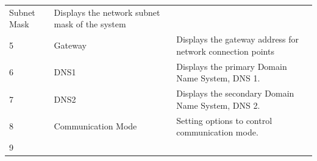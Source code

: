 \begin{longtable}[]{@{}|l|l|l|@{}}
\begin{minipage}[t]{0.23\columnwidth}
Subnet Mask\strut
\end{minipage} & \begin{minipage}[t]{0.65\columnwidth}\raggedright
Displays the network subnet mask of the system\strut
\end{minipage}\tabularnewline
\begin{minipage}[t]{0.04\columnwidth}\raggedright
5\strut
\end{minipage} & \begin{minipage}[t]{0.23\columnwidth}\raggedright
Gateway\strut
\end{minipage} & \begin{minipage}[t]{0.65\columnwidth}\raggedright
Displays the gateway address for network connection points\strut
\end{minipage}\tabularnewline
\begin{minipage}[t]{0.04\columnwidth}\raggedright
6\strut
\end{minipage} & \begin{minipage}[t]{0.23\columnwidth}\raggedright
DNS1\strut
\end{minipage} & \begin{minipage}[t]{0.65\columnwidth}\raggedright
Displays the primary Domain Name System, DNS 1.\strut
\end{minipage}\tabularnewline
\begin{minipage}[t]{0.04\columnwidth}\raggedright
7\strut
\end{minipage} & \begin{minipage}[t]{0.23\columnwidth}\raggedright
DNS2\strut
\end{minipage} & \begin{minipage}[t]{0.65\columnwidth}\raggedright
Displays the secondary Domain Name System, DNS 2.\strut
\end{minipage}\tabularnewline
\begin{minipage}[t]{0.04\columnwidth}\raggedright
8\strut
\end{minipage} & \begin{minipage}[t]{0.23\columnwidth}\raggedright
Communication Mode\strut
\end{minipage} & \begin{minipage}[t]{0.65\columnwidth}\raggedright
Setting options to control communication mode.\strut
\end{minipage}\tabularnewline
\begin{minipage}[t]{0.04\columnwidth}\raggedright
9\strut
\end{minipage} & \begin{minipage}[t]{0.23\columnwidth}\raggedright

\end{minipage}
\end{longtable}
